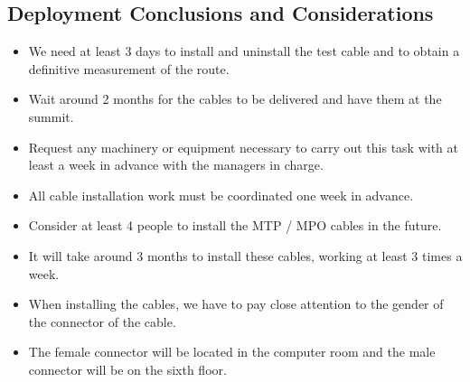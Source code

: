 \newpage

\subsection{Deployment Conclusions and Considerations}

\begin{itemize}
    \item We need at least 3 days to install and uninstall the test cable and to obtain a definitive measurement of the route.
    \item Wait around 2 months for the cables to be delivered and have them at the summit.
    \item Request any machinery or equipment necessary to carry out this task with at least a week in advance with the managers in charge. 
    \item All cable installation work must be coordinated one week in advance.
    \item Consider at least 4 people to install the MTP / MPO cables in the future.
    \item It will take around 3 months to install these cables, working at least 3 times a week.
    \item When installing the cables, we have to pay close attention to the gender of the connector of the cable.
    \item The female connector will be located in the computer room and the male connector will be on the sixth floor.
\end{itemize}

\newpage